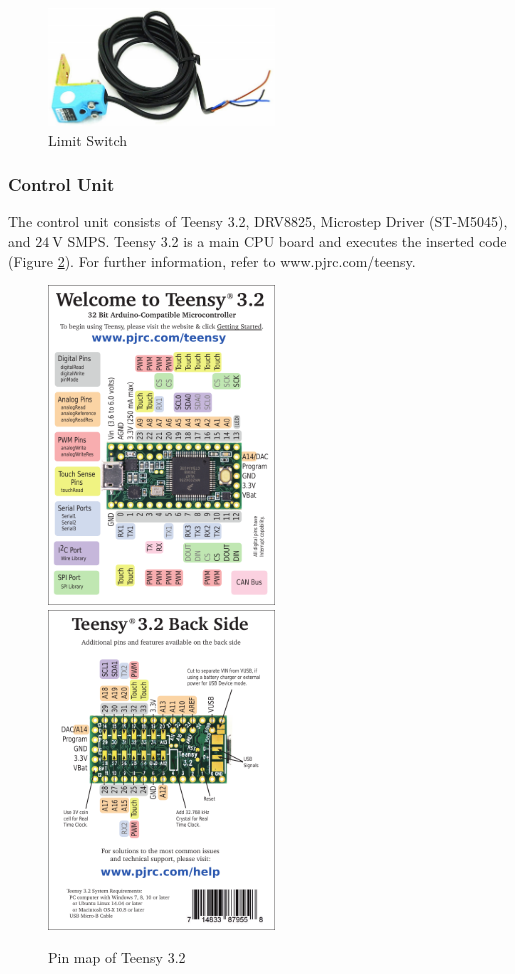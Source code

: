 \begin{figure}[H]
    \centering
    \captionsetup{justification=centering}
    \includegraphics[width = 6cm]{images/Limit_Switch.jpg}
    \caption{Limit Switch}
    \label{limit switch}
\end{figure}

\subsubsection{Control Unit}

The control unit consists of Teensy 3.2, DRV8825, Microstep Driver (ST-M5045), and $24\mathrm{~V}$ SMPS. Teensy 3.2 is a main CPU board and executes the inserted code (Figure \ref{Teensy3.2}). For further information, refer to www.pjrc.com/teensy.

\begin{figure}[H]
    \centering
    \captionsetup{justification=centering}
    \includegraphics[width=6cm]{images/Teensy3.2 - 1.pdf}
    \includegraphics[width=6cm]{images/Teensy3.2 - 2.pdf}
    \caption{Pin map of Teensy 3.2}
    \label{Teensy3.2}
\end{figure}

